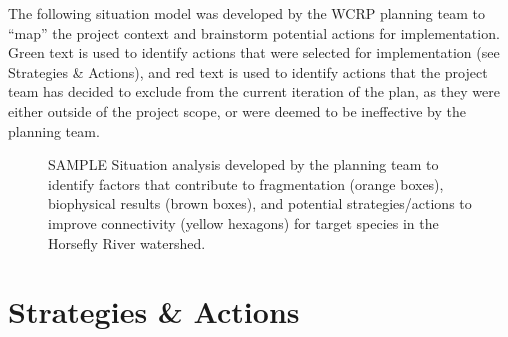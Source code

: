 \documentclass[
  letterpaper,
  DIV=11,
  numbers=noendperiod]{scrreprt}
\begin{document}

The following situation model was developed by the WCRP planning team to
``map'' the project context and brainstorm potential actions for
implementation. Green text is used to identify actions that were
selected for implementation (see Strategies \& Actions), and red text is
used to identify actions that the project team has decided to exclude
from the current iteration of the plan, as they were either outside of
the project scope, or were deemed to be ineffective by the planning
team.

\begin{figure}


\caption{\label{fig-sitan}SAMPLE Situation analysis developed by the
planning team to identify factors that contribute to fragmentation
(orange boxes), biophysical results (brown boxes), and potential
strategies/actions to improve connectivity (yellow hexagons) for target
species in the Horsefly River watershed.}

\end{figure}%

\section*{Strategies \& Actions}\label{strategies-actions}

\end{document}
